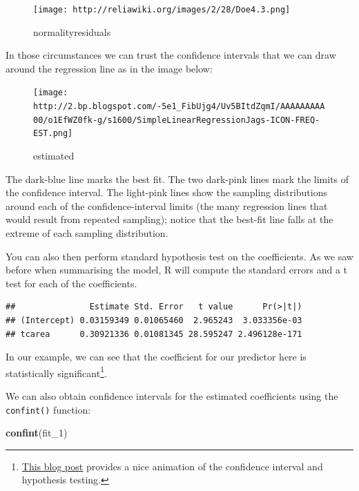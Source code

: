 \documentclass[]{book}
\newenvironment{Shaded}{\begin{snugshade}}{\end{snugshade}}
\newcommand{\DecValTok}[1]{\textcolor[rgb]{0.00,0.00,0.81}{#1}}
\newcommand{\KeywordTok}[1]{\textcolor[rgb]{0.13,0.29,0.53}{\textbf{#1}}}
\newcommand{\NormalTok}[1]{#1}
\newcommand{\OperatorTok}[1]{\textcolor[rgb]{0.81,0.36,0.00}{\textbf{#1}}}
\let\rmarkdownfootnote\footnote%
\def\footnote{\protect\rmarkdownfootnote}
\theoremstyle{definition}
\theoremstyle{definition}
\theoremstyle{definition}
\theoremstyle{remark}
\begin{document}
\begin{figure}
\centering
\texttt{[image: http://reliawiki.org/images/2/28/Doe4.3.png]}
\caption{normalityresiduals}
\end{figure}

In those circumstances we can trust the confidence intervals that we can
draw around the regression line as in the image below:

\begin{figure}
\centering
\texttt{[image: http://2.bp.blogspot.com/-5e1\_FibUjg4/Uv5BItdZqmI/AAAAAAAAA00/o1EfWZ0fk-g/s1600/SimpleLinearRegressionJags-ICON-FREQ-EST.png]}
\caption{estimated}
\end{figure}

The dark-blue line marks the best fit. The two dark-pink lines mark the
limits of the confidence interval. The light-pink lines show the
sampling distributions around each of the confidence-interval limits
(the many regression lines that would result from repeated sampling);
notice that the best-fit line falls at the extreme of each sampling
distribution.

You can also then perform standard hypothesis test on the coefficients.
As we saw before when summarising the model, R will compute the standard
errors and a t test for each of the coefficients.

\begin{Shaded}
\end{Shaded}

\begin{verbatim}
##               Estimate Std. Error   t value      Pr(>|t|)
## (Intercept) 0.03159349 0.01065460  2.965243  3.033356e-03
## tcarea      0.30921336 0.01081345 28.595247 2.496128e-171
\end{verbatim}

In our example, we can see that the coefficient for our predictor here
is statistically significant\footnote{\href{http://www.sumsar.net/blog/2013/12/an-animation-of-the-construction-of-a-confidence-interval/}{This
  blog post} provides a nice animation of the confidence interval and
  hypothesis testing.}.

We can also obtain confidence intervals for the estimated coefficients
using the \texttt{confint()} function:

\begin{Shaded}
\begin{Highlighting}[]
\KeywordTok{confint}\NormalTok{(fit_}\DecValTok{1}\NormalTok{)}
\end{Highlighting}
\end{Shaded}
\end{document}
